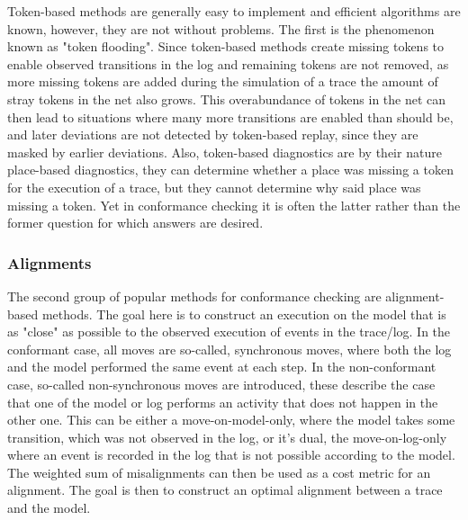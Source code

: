 \documentclass[runningheads]{template/llncs}
\begin{document}
Token-based methods are generally easy to implement and efficient algorithms are known, however, they are not without problems.
The first is the phenomenon known as "token flooding". Since token-based methods create missing tokens to enable observed transitions in the log and remaining tokens are not removed, as more missing tokens are added during the simulation of a trace the  amount of stray tokens in the net also grows.
This overabundance of tokens in the net can then lead to situations where many more transitions are enabled than should be, and later deviations are not detected by token-based replay, since they are masked by earlier deviations.
Also, token-based diagnostics are  by their nature place-based diagnostics, they can determine whether a place was missing a token for the execution of a trace, but they cannot determine why said place was missing a token. 
Yet in conformance checking it is often the latter rather than the former question for which answers are desired. 

\subsubsection{Alignments}

The second group of popular methods for conformance checking are alignment-based methods.
The goal here is to construct an execution on the model that is as "close" as possible to the observed execution of events in the trace/log.
In the conformant case, all moves are so-called, synchronous moves, where both the log and the model performed the same event at each step.
In the non-conformant case, so-called non-synchronous moves are introduced, these describe the case that one of  the model or log performs an activity that does not happen in the other one.
This can be either a move-on-model-only, where the model takes some transition, which was not observed in the log, or it's dual, the move-on-log-only where an event is recorded in the log that is not possible according to the model.
The weighted sum of misalignments can then be used as a cost metric for an alignment. 
The goal is then to construct an optimal alignment between a trace and the model.
\end{document}
